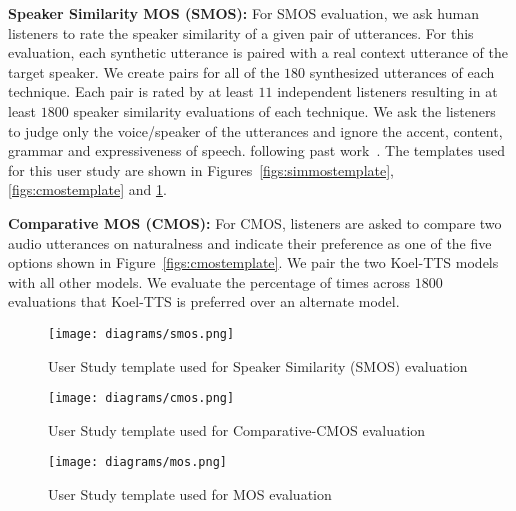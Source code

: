 \textbf{Speaker Similarity MOS (SMOS):} For SMOS evaluation, we ask human listeners to rate the speaker similarity of a given pair of utterances. For this evaluation, each synthetic utterance is paired with a real context utterance of the target speaker. We create pairs for all of the $180$ synthesized utterances of each technique. Each pair is rated by at least $11$ independent listeners resulting in at least $1800$ speaker similarity evaluations of each technique. We ask the listeners to judge only the voice/speaker of the utterances and ignore the accent, content, grammar and expressiveness of speech. following past work~\citep{casanova2022yourtts,hussain2023ace,neekharaselfvc}. The templates used for this user study are shown in Figures~\ref{figs:simmostemplate}, \ref{figs:cmostemplate} and \ref{figs:mostemplate}. 

\textbf{Comparative MOS (CMOS):} For CMOS, listeners are asked to compare two audio utterances on naturalness and indicate their preference as one of the five options shown in Figure~\ref{figs:cmostemplate}. We pair the two Koel-TTS models with all other models. We evaluate the percentage of times across $1800$ evaluations that Koel-TTS is preferred over an alternate model.


\begin{figure}[h]
    \centering
    \begin{minipage}{0.31\textwidth}
        \centering
        \texttt{[image: diagrams/smos.png]}
        \caption{\footnotesize{User Study template used for Speaker Similarity (SMOS) evaluation}}
        \label{figs:simmostemplate}
    \end{minipage}\hfill
    \begin{minipage}{0.31\textwidth}
        \centering
        \texttt{[image: diagrams/cmos.png]}
        \vspace{2mm}
        \caption{\footnotesize{User Study template used for Comparative-CMOS evaluation}}
        \label{figs:cmostemplate}
    \end{minipage}\hfill
    \begin{minipage}{0.31\textwidth}
        \centering
        \texttt{[image: diagrams/mos.png]}
        \vspace{6mm}
        \caption{\footnotesize{User Study template used for MOS evaluation}}
        \label{figs:mostemplate}
    \end{minipage}
\end{figure}

